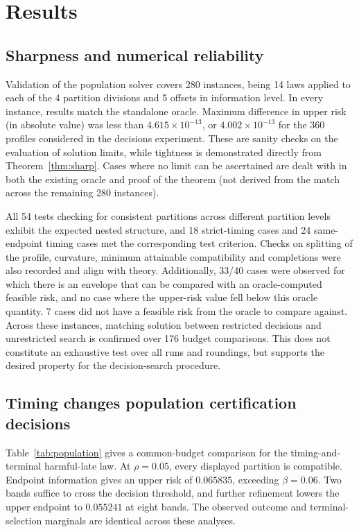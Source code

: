 \section{Results}\label{sec:results}
\subsection{Sharpness and numerical reliability}
Validation of the population solver covers 280 instances, being 14 laws applied to each of the 4 partition divisions and 5 offsets in information level. In every instance, results match the standalone oracle. Maximum difference in upper risk (in absolute value) was less than $4.615\times10^{-13}$, or $4.002\times10^{-13}$ for the 360 profiles considered in the decisions experiment. These are sanity checks on the evaluation of solution limits, while tightness is demonstrated directly from Theorem~\ref{thm:sharp}. Cases where no limit can be ascertained are dealt with in both the existing oracle and proof of the theorem (not derived from the match across the remaining 280 instances).

All 54 tests checking for consistent partitions across different partition levels exhibit the expected nested structure, and 18 strict-timing cases and 24 same-endpoint timing cases met the corresponding test criterion. Checks on splitting of the profile, curvature, minimum attainable compatibility and completions were also recorded and align with theory. Additionally, 33/40 cases were observed for which there is an envelope that can be compared with an oracle-computed feasible risk, and no case where the upper-risk value fell below this oracle quantity. 7 cases did not have a feasible risk from the oracle to compare against. Across these instances, matching solution between restricted decisions and unrestricted search is confirmed over 176 budget comparisons. This does not constitute an exhaustive test over all runs and roundings, but supports the desired property for the decision-search procedure.
\subsection{Timing changes population certification decisions}
Table~\ref{tab:population} gives a common-budget comparison for the timing-and-terminal harmful-late law. At $\rho=0.05$, every displayed partition is compatible. Endpoint information gives an upper risk of $0.065835$, exceeding $\beta=0.06$. Two bands suffice to cross the decision threshold, and further refinement lowers the upper endpoint to $0.055241$ at eight bands. The observed outcome and terminal-selection marginals are identical across these analyses.

